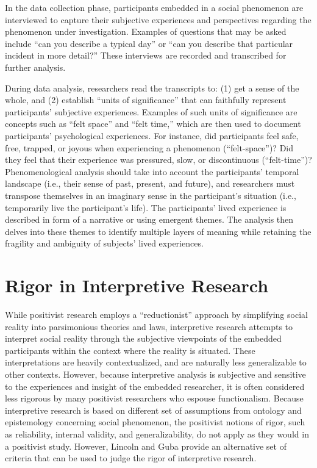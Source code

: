 In the data collection phase, participants embedded in a social phenomenon are interviewed to capture their subjective experiences and perspectives regarding the phenomenon under investigation. Examples of questions that may be asked include ``can you describe a typical day'' or ``can you describe that particular incident in more detail?'' These interviews are recorded and transcribed for further analysis. 

During data analysis, researchers read the transcripts to: (1) get a sense of the whole, and (2) establish ``units of significance'' that can faithfully represent participants' subjective experiences. Examples of such units of significance are concepts such as ``felt space'' and ``felt time,'' which are then used to document participants' psychological experiences. For instance, did participants feel safe, free, trapped, or joyous when experiencing a phenomenon (``felt-space'')? Did they feel that their experience was pressured, slow, or discontinuous (``felt-time'')? Phenomenological analysis should take into account the participants' temporal landscape (i.e., their sense of past, present, and future), and researchers must transpose themselves in an imaginary sense in the participant's situation (i.e., temporarily live the participant's life). The participants' lived experience is described in form of a narrative or using emergent themes. The analysis then delves into these themes to identify multiple layers of meaning while retaining the fragility and ambiguity of subjects' lived experiences.

\section{Rigor in Interpretive Research}

While positivist research employs a ``reductionist'' approach by simplifying social reality into parsimonious theories and laws, interpretive research attempts to interpret social reality through the subjective viewpoints of the embedded participants within the context where the reality is situated. These interpretations are heavily contextualized, and are naturally less generalizable to other contexts. However, because interpretive analysis is subjective and sensitive to the experiences and insight of the embedded researcher, it is often considered less rigorous by many \gls{positivist} researchers who espouse \gls{functionalism}. Because interpretive research is based on different set of assumptions from \gls{ontology} and \gls{epistemology} concerning social phenomenon, the positivist notions of rigor, such as reliability, internal validity, and generalizability, do not apply as they would in a positivist study. However, Lincoln and Guba\cite{lincoln1985naturalistic} provide an alternative set of criteria that can be used to judge the rigor of interpretive research.


